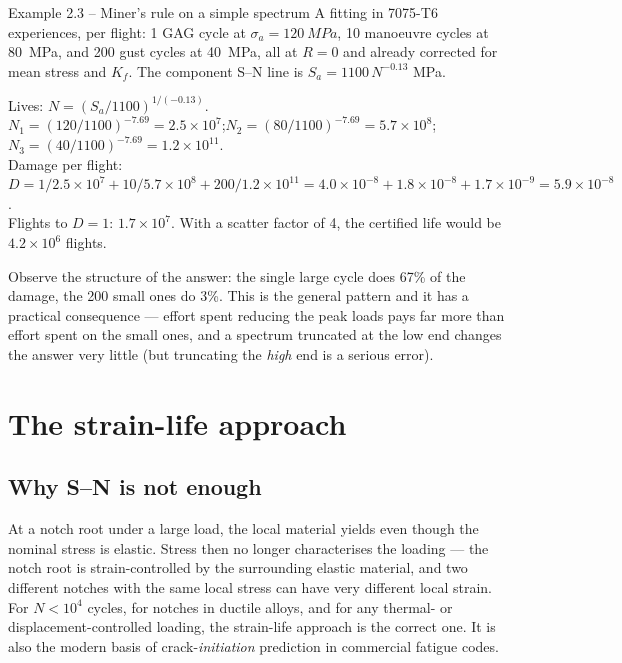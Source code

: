 \documentclass[11pt,a4paper]{article}
\begin{document}
\begin{examplebox}{Example 2.3 -- Miner's rule on a simple spectrum}
A fitting in 7075-T6 experiences, per flight: 1 GAG cycle at $\sigma_a=\SI{120}{MPa}$, 10 manoeuvre cycles at \SI{80}{MPa}, and 200 gust cycles at \SI{40}{MPa}, all at $R=0$ and already corrected for mean stress and $K_f$. The component S--N line is $S_a=1100\,N^{-0.13}$ MPa.

Lives: $N=(S_a/1100)^{1/(-0.13)}$.\\
$N_1=(120/1100)^{-7.69}=2.5\times10^{7}$;\quad $N_2=(80/1100)^{-7.69}=5.7\times10^{8}$;\quad $N_3=(40/1100)^{-7.69}=1.2\times10^{11}$.\\
Damage per flight: $D=1/2.5{\times}10^{7}+10/5.7{\times}10^{8}+200/1.2{\times}10^{11}=4.0\times10^{-8}+1.8\times10^{-8}+1.7\times10^{-9}=5.9\times10^{-8}$.\\
Flights to $D=1$: $1.7\times10^{7}$. With a scatter factor of 4, the certified life would be $4.2\times10^{6}$ flights.

Observe the structure of the answer: the single large cycle does 67\% of the damage, the 200 small ones do 3\%. This is the general pattern and it has a practical consequence --- effort spent reducing the peak loads pays far more than effort spent on the small ones, and a spectrum truncated at the low end changes the answer very little (but truncating the \emph{high} end is a serious error).
\end{examplebox}

\section{The strain-life approach}

\subsection{Why S--N is not enough}
At a notch root under a large load, the local material yields even though the nominal stress is elastic. Stress then no longer characterises the loading --- the notch root is strain-controlled by the surrounding elastic material, and two different notches with the same local stress can have very different local strain. For $N<10^{4}$ cycles, for notches in ductile alloys, and for any thermal- or displacement-controlled loading, the strain-life approach is the correct one. It is also the modern basis of crack-\emph{initiation} prediction in commercial fatigue codes.
\end{document}
